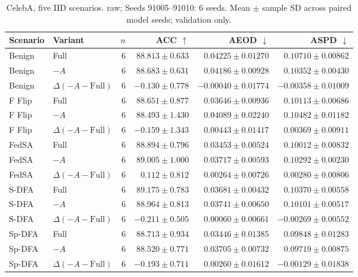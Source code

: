 \begin{table}[t]
\centering
\small
\caption{CelebA, five IID scenarios. raw; Seeds 91005–91010: 6 seeds. Mean $\pm$ sample SD across paired model seeds; validation only.}
\begin{tabular}{llrrrr}
\toprule
Scenario & Variant & $n$ & ACC $\uparrow$ & AEOD $\downarrow$ & ASPD $\downarrow$ \\
\midrule
Benign & Full & 6 & $88.813 \pm 0.633$ & $0.04225 \pm 0.01270$ & $0.10710 \pm 0.00862$ \\
Benign & $-A$ & 6 & $88.683 \pm 0.631$ & $0.04186 \pm 0.00928$ & $0.10352 \pm 0.00430$ \\
Benign & $\Delta(-A-\mathrm{Full})$ & 6 & $-0.130 \pm 0.778$ & $-0.00040 \pm 0.01774$ & $-0.00358 \pm 0.01009$ \\
F Flip & Full & 6 & $88.651 \pm 0.877$ & $0.03646 \pm 0.00936$ & $0.10113 \pm 0.00686$ \\
F Flip & $-A$ & 6 & $88.493 \pm 1.430$ & $0.04089 \pm 0.02240$ & $0.10482 \pm 0.01182$ \\
F Flip & $\Delta(-A-\mathrm{Full})$ & 6 & $-0.159 \pm 1.343$ & $0.00443 \pm 0.01417$ & $0.00369 \pm 0.00911$ \\
FedSA & Full & 6 & $88.894 \pm 0.796$ & $0.03453 \pm 0.00524$ & $0.10012 \pm 0.00832$ \\
FedSA & $-A$ & 6 & $89.005 \pm 1.000$ & $0.03717 \pm 0.00593$ & $0.10292 \pm 0.00230$ \\
FedSA & $\Delta(-A-\mathrm{Full})$ & 6 & $0.112 \pm 0.812$ & $0.00264 \pm 0.00726$ & $0.00280 \pm 0.00806$ \\
S-DFA & Full & 6 & $89.175 \pm 0.783$ & $0.03681 \pm 0.00432$ & $0.10370 \pm 0.00558$ \\
S-DFA & $-A$ & 6 & $88.964 \pm 0.813$ & $0.03741 \pm 0.00650$ & $0.10101 \pm 0.00517$ \\
S-DFA & $\Delta(-A-\mathrm{Full})$ & 6 & $-0.211 \pm 0.505$ & $0.00060 \pm 0.00661$ & $-0.00269 \pm 0.00552$ \\
Sp-DFA & Full & 6 & $88.713 \pm 0.934$ & $0.03446 \pm 0.01385$ & $0.09848 \pm 0.01283$ \\
Sp-DFA & $-A$ & 6 & $88.520 \pm 0.771$ & $0.03705 \pm 0.00732$ & $0.09719 \pm 0.00875$ \\
Sp-DFA & $\Delta(-A-\mathrm{Full})$ & 6 & $-0.193 \pm 0.711$ & $0.00260 \pm 0.01612$ & $-0.00129 \pm 0.01838$ \\
\bottomrule
\end{tabular}
\end{table}

